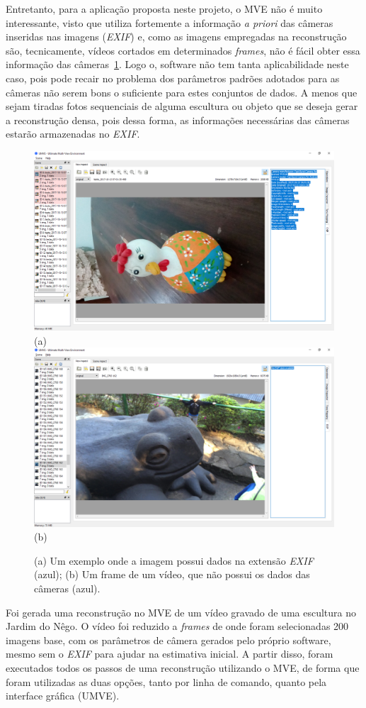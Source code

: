 Entretanto, para a aplicação proposta neste projeto, o MVE não é muito interessante,
visto que utiliza fortemente a informação \emph{a priori} das câmeras inseridas nas imagens
(\emph{EXIF}) e, como as imagens empregadas na reconstrução são, tecnicamente,
vídeos cortados em determinados \emph{frames}, não é fácil obter essa informação
das câmeras~\ref{fig:mveexif}. Logo o, software não tem tanta aplicabilidade
neste caso, pois pode recair no problema dos parâmetros padrões adotados para as
câmeras não serem bons o suficiente para estes conjuntos de dados. A menos que
sejam tiradas fotos sequenciais de alguma escultura ou objeto que se deseja
gerar a reconstrução densa, pois dessa forma, as informações necessárias das
câmeras estarão armazenadas no \emph{EXIF}. 

\begin{figure}[!h]
	\centering
	\includegraphics[width=0.461\linewidth]{figs/exifumve.png}(a)
	\includegraphics[width=0.461\linewidth]{figs/exifsemumve.png}(b)
	\caption{%
  (a) Um exemplo onde a imagem possui dados na extensão \emph{EXIF}
  (azul); (b) Um frame de um vídeo, que não
  possui os dados das câmeras (azul).
	}\label{fig:mveexif}
\end{figure} 

Foi gerada uma reconstrução no MVE de um vídeo gravado de uma escultura no Jardim do
Nêgo. O  vídeo foi reduzido a \emph{frames} de onde foram selecionadas 200 imagens base,
com os parâmetros de câmera gerados pelo próprio software, mesmo sem o
\emph{EXIF} para ajudar na estimativa inicial. 
A partir disso, foram executados todos os passos de uma reconstrução utilizando o
MVE, de forma que foram utilizadas as duas opções, tanto por linha de comando,
quanto pela interface gráfica (UMVE).

